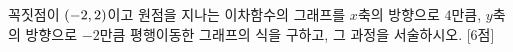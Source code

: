 꼭짓점이 $(-2{,}\mkern3mu 2)$이고 원점을 지나는 이차함수의 그래프를 $x$축의 방향으로 $4$만큼, $y$축의 방향으로 $-2$만큼 평행이동한 그래프의 식을 구하고, 그 과정을 서술하시오. \mbox{[6점]}
